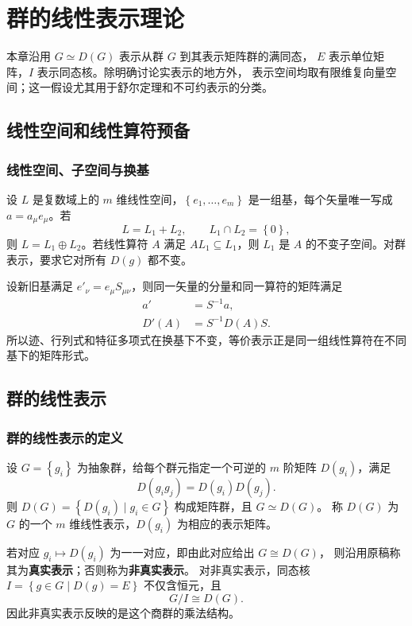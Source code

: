 \chapter{群的线性表示理论}

本章沿用 $G\simeq D\left(G\right)$ 表示从群 $G$ 到其表示矩阵群的满同态，
$E$ 表示单位矩阵，$I$ 表示同态核。除明确讨论实表示的地方外，
表示空间均取有限维复向量空间；这一假设尤其用于舒尔定理和不可约表示的分类。

\section{线性空间和线性算符预备}
\subsection{线性空间、子空间与换基}
设 $L$ 是复数域上的 $m$ 维线性空间，$\left\{e_1,\ldots,e_m\right\}$ 是一组基，每个矢量唯一写成 $a=a_\mu e_\mu$。若
\begin{equation}
L=L_1+L_2,\qquad L_1\cap L_2=\left\{0\right\},
\end{equation}
则 $L=L_1\oplus L_2$。若线性算符 $A$ 满足 $AL_1\subseteq L_1$，则 $L_1$ 是 $A$ 的不变子空间。对群表示，要求它对所有 $D\left(g\right)$ 都不变。

设新旧基满足 $e'_\nu=e_\mu S_{\mu\nu}$，则同一矢量的分量和同一算符的矩阵满足
\begin{align}
a'&=S^{-1}a,\\
D'\left(A\right)&=S^{-1}D\left(A\right)S.
\end{align}
所以迹、行列式和特征多项式在换基下不变，等价表示正是同一组线性算符在不同基下的矩阵形式。


\section{群的线性表示}
\subsection{群的线性表示的定义}
\begin{definition}[线性表示]
设 $G=\left\{g_i\right\}$ 为抽象群，给每个群元指定一个可逆的 $m$ 阶矩阵 $D\left(g_i\right)$，满足
\begin{equation}
D\left(g_i g_j\right)=D\left(g_i\right)D\left(g_j\right).
\end{equation}
则 $D\left(G\right)=\left\{D\left(g_i\right)\mid g_i\in G\right\}$ 构成矩阵群，且 $G\simeq D\left(G\right)$。
称 $D\left(G\right)$ 为 $G$ 的一个 $m$ 维线性表示，$D\left(g_i\right)$ 为相应的表示矩阵。
\end{definition}
若对应 $g_i\mapsto D\left(g_i\right)$ 为一一对应，即由此对应给出 $G\cong D\left(G\right)$，
则沿用原稿称其为\textbf{真实表示}；否则称为\textbf{非真实表示}。
对非真实表示，同态核 $I=\left\{g\in G\mid D\left(g\right)=E\right\}$ 不仅含恒元，且
\begin{equation}
G/I\cong D\left(G\right).
\end{equation}
因此非真实表示反映的是这个商群的乘法结构。

